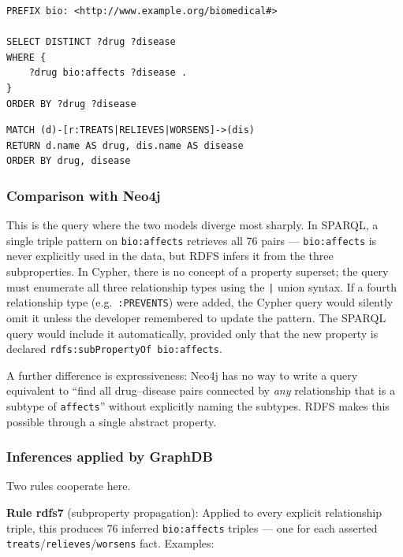 \documentclass[11pt,a4paper]{article}
\begin{document}
\begin{lstlisting}[style=sparql, caption={SPARQL: all drug--disease interaction pairs.}]
PREFIX bio: <http://www.example.org/biomedical#>

SELECT DISTINCT ?drug ?disease
WHERE {
    ?drug bio:affects ?disease .
}
ORDER BY ?drug ?disease
\end{lstlisting}

\begin{lstlisting}[style=cypher, caption={Cypher equivalent: all drug--disease interactions.}]
MATCH (d)-[r:TREATS|RELIEVES|WORSENS]->(dis)
RETURN d.name AS drug, dis.name AS disease
ORDER BY drug, disease
\end{lstlisting}

\subsubsection*{Comparison with Neo4j}

This is the query where the two models diverge most sharply.
In SPARQL, a single triple pattern on \texttt{bio:affects} retrieves all 76
pairs — \texttt{bio:affects} is never explicitly used in the data, but RDFS
infers it from the three subproperties.  In Cypher, there is no concept of a
property superset; the query must enumerate all three relationship types
using the \texttt{|} union syntax.  If a fourth relationship type (e.g.\
\texttt{:PREVENTS}) were added, the Cypher query would silently omit it unless
the developer remembered to update the pattern.  The SPARQL query would include
it automatically, provided only that the new property is declared
\texttt{rdfs:subPropertyOf bio:affects}.

A further difference is expressiveness: Neo4j has no way to write a query
equivalent to ``find all drug–disease pairs connected by \emph{any} relationship
that is a subtype of \texttt{affects}'' without explicitly naming the subtypes.
RDFS makes this possible through a single abstract property.

\subsubsection*{Inferences applied by GraphDB}

Two rules cooperate here.

\textbf{Rule rdfs7} (subproperty propagation): Applied to every explicit relationship triple, this produces 76 inferred
\texttt{bio:affects} triples — one for each asserted
\texttt{treats}/\texttt{relieves}/\texttt{worsens} fact.  Examples:
\end{document}
